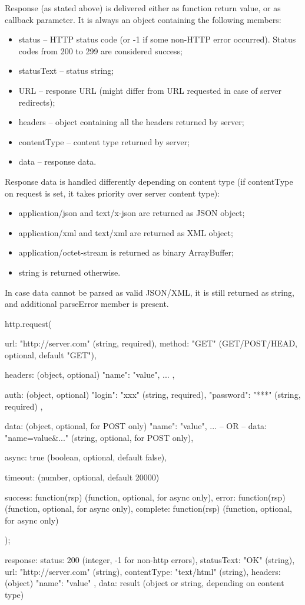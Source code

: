 Response (as stated above) is delivered either as function return value, or as callback 
parameter. It is always an object containing the following members:

\begin{itemize}
\item status – HTTP status code (or -1 if some non-HTTP error occurred). Status codes 
from 200 to 299 are considered success;
\item statusText – status string;
\item URL – response URL (might differ from URL requested in case of server redirects);
\item headers – object containing all the headers returned by server;
\item contentType – content type returned by server;
\item data – response data.
\end{itemize}

Response data is handled differently depending on content type (if contentType on request 
is set, it takes priority over server content type):

\begin{itemize}
\item application/json and text/x-json are returned as JSON object;
\item application/xml and text/xml are returned as XML object;
\item application/octet-stream is returned as binary ArrayBuffer;
\item string is returned otherwise.
\end{itemize}
In case data cannot be parsed as valid JSON/XML, it is still returned as string, and 
additional parseError member is present.


\begin{listingverbatim}
http.request({
	url: "http://server.com" (string, required),
	method: "GET" (GET/POST/HEAD, optional, default "GET"),
	
	headers: (object, optional)
	{
		"name": "value",
		...
	},
	
	auth: (object, optional)
	{
		"login": "xxx" (string, required),
		"password": "***" (string, required)
	},
	
	data: (object, optional, for POST only)
	{
		"name": "value",
		...
	}
	-- OR --
	data: "name=value&..." (string, optional, for POST only),

	async: true (boolean, optional, default false),

	timeout: (number, optional, default 20000)
	
	success: function(rsp) {} (function, optional, for async only),
	error: function(rsp) {} (function, optional, for async only),
	complete: function(rsp) {} (function, optional, for async only)
});


response:
{
	status: 200 (integer, -1 for non-http errors),
	statusText: "OK" (string),
	url: "http://server.com" (string),
	contentType: "text/html" (string),
	headers: (object)
	{
		"name": "value"
	},
	data: result (object or string, depending on content type)
}
\end{listingverbatim}

